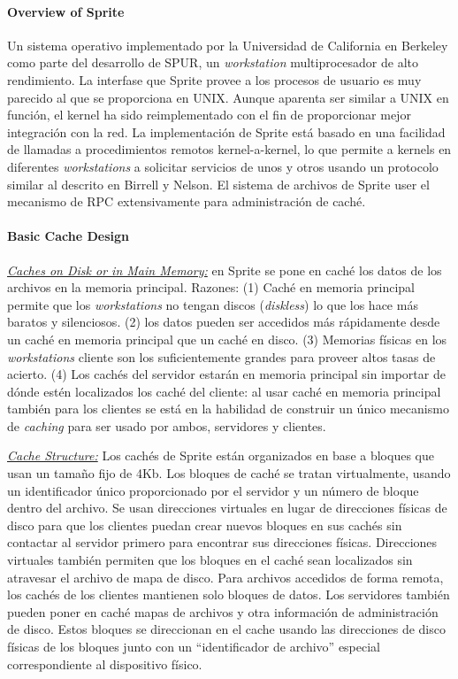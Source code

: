 \paragraph{\textnormal{\textbf{Overview of Sprite}}}
Un sistema operativo implementado por la Universidad de California en Berkeley como parte del desarrollo de SPUR, un \emph{workstation} multiprocesador de alto rendimiento. La interfase que Sprite provee a los procesos de usuario es muy parecido al que se proporciona en UNIX. Aunque aparenta ser similar a UNIX en función, el kernel ha sido reimplementado con el fin de proporcionar mejor integración con la red. La implementación de Sprite está basado en una facilidad de llamadas a procedimientos remotos kernel-a-kernel, lo que permite a kernels en diferentes \emph{workstations} a solicitar servicios de unos y otros usando un protocolo similar al descrito en Birrell y Nelson. El sistema de archivos de Sprite user el mecanismo de RPC extensivamente para administración de caché.

\paragraph{\textnormal{\textbf{Basic Cache Design}}}
\underline{\emph{Caches on Disk or in Main Memory:}} en Sprite se pone en caché los datos de los archivos en la memoria principal. Razones: (1) Caché en memoria principal permite que los \emph{workstations} no tengan discos (\emph{diskless}) lo que los hace más baratos y silenciosos. (2) los datos pueden ser accedidos más rápidamente desde un caché en memoria principal que un caché en disco. (3) Memorias físicas en los \emph{workstations} cliente son los suficientemente grandes para proveer altos tasas de acierto. (4) Los cachés del servidor estarán en memoria principal sin importar de dónde estén localizados los caché del cliente: al usar caché en memoria principal también para los clientes se está en la habilidad de construir un único mecanismo de \emph{caching} para ser usado por ambos, servidores y clientes. 

\underline{\emph{Cache Structure:}} Los cachés de Sprite están organizados en base a bloques que usan un tamaño fijo de 4Kb. Los bloques de caché se tratan virtualmente, usando un identificador único proporcionado por el servidor y un número de bloque dentro del archivo. Se usan direcciones virtuales en lugar de direcciones físicas de disco para que los clientes puedan crear nuevos bloques en sus cachés sin contactar al servidor primero para encontrar sus direcciones físicas. Direcciones virtuales también permiten que los bloques en el caché sean localizados sin atravesar el archivo de mapa de disco. Para archivos accedidos de forma remota, los cachés de los clientes mantienen solo bloques de datos. Los servidores también pueden poner en caché mapas de archivos y otra información de administración de disco. Estos bloques se direccionan en el cache usando las direcciones de disco físicas de los bloques junto con un ``identificador de archivo'' especial correspondiente al dispositivo físico. 

